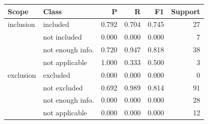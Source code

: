\begin{tabular}{llrrrr}\toprule
Scope & Class & P & R & F1 & Support \\\midrule
inclusion & included & 0.792 & 0.704 & 0.745 & 27 \\
 & not included & 0.000 & 0.000 & 0.000 & 7 \\
 & not enough info. & 0.720 & 0.947 & 0.818 & 38 \\
 & not applicable & 1.000 & 0.333 & 0.500 & 3 \\
\midrule
exclusion & excluded & 0.000 & 0.000 & 0.000 & 0 \\
 & not excluded & 0.692 & 0.989 & 0.814 & 91 \\
 & not enough info. & 0.000 & 0.000 & 0.000 & 28 \\
 & not applicable & 0.000 & 0.000 & 0.000 & 12 \\
\bottomrule\end{tabular}
